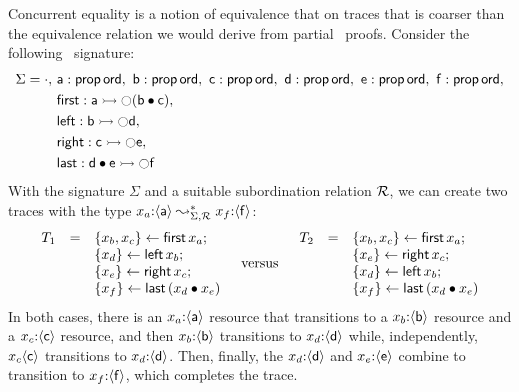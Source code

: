 Concurrent equality is a notion of equivalence that on traces that is
coarser than the equivalence relation we would derive from partial
\ollll~proofs. Consider the following \sls~signature:
\begin{align*}
 \Sigma = \cdot, 
~&{\sf a} : {\sf prop}\,{\sf ord},
~ {\sf b} : {\sf prop}\,{\sf ord},
~ {\sf c} : {\sf prop}\,{\sf ord},
~ {\sf d} : {\sf prop}\,{\sf ord},
~ {\sf e} : {\sf prop}\,{\sf ord},
~ {\sf f} : {\sf prop}\,{\sf ord},
\\ & 
  {\sf first}  : {\sf a} \rightarrowtail {\ocircle}({\sf b} \mathbin{\bullet} {\sf c}), 
\\ &
  {\sf left}  : {\sf b} \rightarrowtail {\ocircle}{\sf d}, ~
\\ &
  {\sf right} : {\sf c} \rightarrowtail {\ocircle}{\sf e}, ~
\\ &
  {\sf last} : {\sf d} \mathbin{\bullet} {\sf e} \rightarrowtail {\ocircle}{\sf f}
\end{align*}
With the signature $\Sigma$ and a suitable subordination relation $\mathcal R$, 
we can create two traces with the type
$x_a{:}\langle {\sf a} \rangle \leadsto^*_{\Sigma,\mathcal R} x_f{:}\langle {\sf f} \rangle$:
\[
\begin{array}{rcl}
T_1 & = 
 & \{{x_b, x_c}\} \leftarrow {\sf first}\,x_a;\\
&& \{{x_d}\} \leftarrow {\sf left}\,x_b;\\
&& \{{x_e}\} \leftarrow {\sf right}\,x_c;\\
&& \{{x_f}\} \leftarrow {\sf last}\,({x_d} \mathbin{\bullet} {x_e})
\end{array}
\quad
\mbox{versus}
\quad
\begin{array}{rcl}
T_2 & = 
 & \{{x_b, x_c}\} \leftarrow {\sf first}\,x_a;\\
&& \{{x_e}\} \leftarrow {\sf right}\,x_c;\\
&& \{{x_d}\} \leftarrow {\sf left}\,x_b;\\
&& \{{x_f}\} \leftarrow {\sf last}\,({x_d} \mathbin{\bullet} {x_e})
\end{array}
\]
In both cases, there is an $x_a{:}\langle {\sf a} \rangle$ resource
that transitions to a $x_b{:}\langle {\sf b} \rangle$ resource and a
$x_c{:}\langle {\sf c} \rangle$ resource, and then $x_b{:}\langle {\sf b} \rangle$
transitions to $x_d{:}\langle {\sf d} \rangle$ while, independently,
$x_c{}\langle {\sf c} \rangle$ transitions to $x_d{:}\langle {\sf d} \rangle$. Then,
finally, the $x_d{:}\langle {\sf d} \rangle$ and $x_e{:}\langle {\sf e} \rangle$ combine to
transition to $x_f{:}\langle {\sf f} \rangle$, which completes the trace. 

